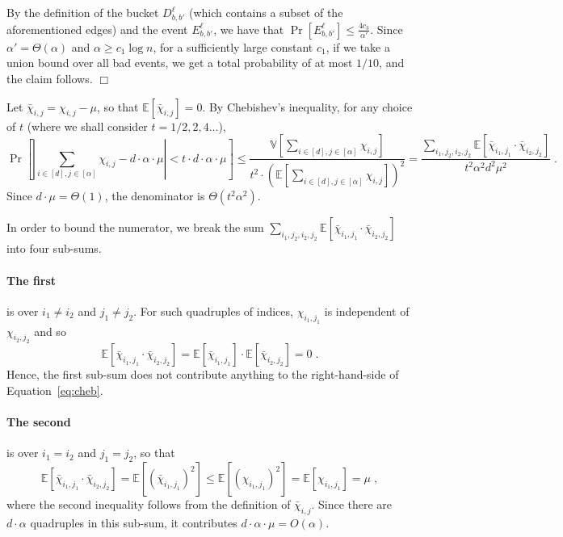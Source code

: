 \documentclass{article}
\newcommand{\Ex}{\mathbb{E}}
\newcommand{\Var}{\mathbb{V}}
\newenvironment{proofof}[1]{\smallskip\noindent{\bf Proof of #1:}}%
        {\hspace*{\fill}$\Box$\par}
\begin{document}
\begin{proofof}{Claim~\ref{clm:Pr-Es}}
By the definition of the bucket $D_{b,b'}^\ell$ (which contains a subset of the aforementioned edges) and the event $E^\ell_{b,b'}$, we have that $\Pr[E_{b,b'}^\ell] \leq \frac{4c_3}{\alpha'}$.
Since $\alpha' = \Theta(\alpha)$ and $\alpha \geq c_1\log n$, for a sufficiently large constant $c_1$, if we take a union bound over all bad events, we get a total probability of at most $1/10$, and the claim follows.
\end{proofof}
\iffalse
Let $\bar{\chi}_{i,j} = \chi_{i,j} - \mu$, so that $\Ex[\bar{\chi}_{i,j}] = 0$.
By Chebishev's inequality, for any choice of $t$ (where we shall consider $t=1/2,2,4\dots$),
\begin{equation}\label{eq:cheb}
\Pr\left[\left|\sum_{i\in [d],j\in [\alpha]}\chi_{i,j} - d\cdot \alpha\cdot \mu\right|< t\cdot d\cdot \alpha\cdot \mu \right] \leq \frac{\Var\left[\sum_{i\in [d],j\in [\alpha]}\chi_{i,j}\right]}{t^2\cdot \left(\Ex\left[\sum_{i\in [d],j\in [\alpha]} \chi_{i,j}\right]\right)^2}
= \frac{\sum_{i_1,j_2,i_2,j_2} \Ex[\bar{\chi}_{i_1,j_1}\cdot \bar{\chi}_{i_2,j_2}]}{t^2 \alpha^2 d^2 \mu^2} \;.
\end{equation}
Since $d \cdot \mu = \Theta(1)$, the  denominator is $\Theta(t^2 \alpha^2)$.

In order to bound the numerator,
we break the sum $\sum_{i_1,j_2,i_2,j_2} \Ex[\bar{\chi}_{i_1,j_1}\cdot \bar{\chi}_{i_2,j_2}]$ into four sub-sums.
\paragraph{The first} is over $i_1\neq i_2$ and $j_1 \neq j_2$. For such quadruples of indices, $\chi_{i_1,j_1}$ is independent of $\chi_{i_2,j_2}$ and so
\begin{equation}\label{eq:cheb-C4-lb-case1}
\Ex[\bar{\chi}_{i_1,j_1}\cdot \bar{\chi}_{i_2,j_2}] =  \Ex[\bar{\chi}_{i_1,j_1}]\cdot \Ex[\bar{\chi}_{i_2,j_2}] = 0\;.
\end{equation}
Hence, the first sub-sum does not contribute anything to the right-hand-side of Equation~\eqref{eq:cheb}.

\paragraph{The second} is over $i_1 = i_2$ and $j_1 = j_2$, so that
\begin{equation}\label{eq:cheb-C4-lb2-case2}
\Ex[\bar{\chi}_{i_1,j_1}\cdot \bar{\chi}_{i_2,j_2}] = \Ex[(\bar{\chi}_{i_1,j_1})^2]
\leq \Ex[(\chi_{i_1,j_1})^2] = \Ex[\chi_{i_1,j_1}] = \mu \;,
\end{equation}
where the second inequality follows from the definition of $\bar{\chi}_{i,j}$.
Since there are $d\cdot \alpha$ quadruples in this sub-sum, it contributes $d\cdot\alpha\cdot \mu = O(\alpha)$.
\end{document}

